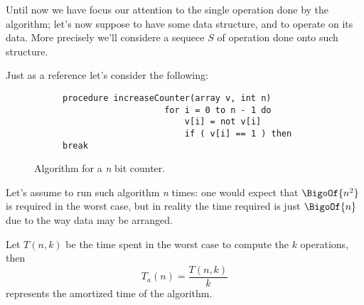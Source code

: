\documentclass{subfiles}
\begin{document}
    Until now we have focus our attention to the single operation done by the algorithm;
    let's now suppose to have some data structure, and to operate on its data. 
    More precisely we'll considere a sequece \(S\) of operation done onto such structure.

    Just as a reference let's consider the following:
    \begin{figure}[!hb]
        \centering
        \begin{subfigure}{0.55\textwidth}
            \begin{lstlisting}[language=PSEUDO]
                procedure increaseCounter(array v, int n)
                    for i = 0 to n - 1 do
                        v[i] = not v[i]
                        if ( v[i] == 1 ) then break 
            \end{lstlisting}
        \end{subfigure}
        \caption{Algorithm for a \emph{n} bit counter.}
    \end{figure}
    Let's assume to run such algorithm \emph{n} times: one would expect that \(\BigoOf{n^{2}}\) is required in the worst case, 
    but in reality the time required is just \(\BigoOf{n}\) due to the way data may be arranged.
    \begin{definition*}
        Let \(T(n ,k)\) be the time spent in the worst case to compute the \(k\)
        operations, then 
        \[
            T_{a}(n) = \frac{T(n, k)}{k}
        \]
        represents the amortized time of the algorithm.
    \end{definition*}
    \clearpage
\end{document}
